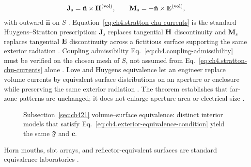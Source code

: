 \begin{equation}
\label{eq:ch4.stratton-chu-currents}
\mathbf{J}_{s}
=
\hat{\mathbf{n}}\times\mathbf{H}^{\mathrm{(vol)}},
\qquad
\mathbf{M}_{s}
=
-\hat{\mathbf{n}}\times\mathbf{E}^{\mathrm{(vol)}},
\end{equation}
with outward \(\hat{\mathbf{n}}\) on \(S\) \cite{stratton1941}. Equation~\eqref{eq:ch4.stratton-chu-currents} is the
standard Huygens--Stratton prescription: \(\mathbf{J}_{s}\) replaces tangential \(\mathbf{H}\) discontinuity and
\(\mathbf{M}_{s}\) replaces tangential \(\mathbf{E}\) discontinuity across a fictitious surface supporting the same
exterior radiation \cite{harrington2001}. Coupling admissibility
Eq.~\eqref{eq:ch4.coupling-admissibility} must be verified on the chosen mesh of \(S\), not assumed from
Eq.~\eqref{eq:ch4.stratton-chu-currents} alone \cite{harrington2001}.
Love and Huygens equivalence let an engineer replace volume currents by equivalent surface distributions on an aperture or enclosure while preserving the same exterior radiation \cite{stratton1941}. The theorem establishes that far-zone patterns are unchanged; it does not enlarge aperture area or electrical size \cite{harrington2001}.
\begin{figure}[t]
\centering
{}
\caption{Subsection~\ref{sec:ch421} volume--surface equivalence: distinct interior models that satisfy
Eq.~\eqref{eq:ch4.exterior-equivalence-condition} yield the same \(\mathfrak{F}\) and \(\mathbf{c}\).}
\label{fig:ch4.volume-surface-equivalence}
\end{figure}
Horn mouths, slot arrays, and reflector-equivalent surfaces are standard equivalence laboratories \cite{collin2001}.
